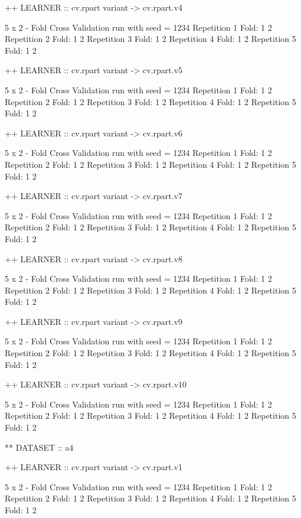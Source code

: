 \documentclass{article}
\begin{document}
\begin{Schunk}
\begin{Soutput}
++ LEARNER :: cv.rpart  variant ->  cv.rpart.v4 

 5 x 2 - Fold Cross Validation run with seed =  1234 
Repetition  1 
Fold:  1  2
Repetition  2 
Fold:  1  2
Repetition  3 
Fold:  1  2
Repetition  4 
Fold:  1  2
Repetition  5 
Fold:  1  2


++ LEARNER :: cv.rpart  variant ->  cv.rpart.v5 

 5 x 2 - Fold Cross Validation run with seed =  1234 
Repetition  1 
Fold:  1  2
Repetition  2 
Fold:  1  2
Repetition  3 
Fold:  1  2
Repetition  4 
Fold:  1  2
Repetition  5 
Fold:  1  2


++ LEARNER :: cv.rpart  variant ->  cv.rpart.v6 

 5 x 2 - Fold Cross Validation run with seed =  1234 
Repetition  1 
Fold:  1  2
Repetition  2 
Fold:  1  2
Repetition  3 
Fold:  1  2
Repetition  4 
Fold:  1  2
Repetition  5 
Fold:  1  2


++ LEARNER :: cv.rpart  variant ->  cv.rpart.v7 

 5 x 2 - Fold Cross Validation run with seed =  1234 
Repetition  1 
Fold:  1  2
Repetition  2 
Fold:  1  2
Repetition  3 
Fold:  1  2
Repetition  4 
Fold:  1  2
Repetition  5 
Fold:  1  2


++ LEARNER :: cv.rpart  variant ->  cv.rpart.v8 

 5 x 2 - Fold Cross Validation run with seed =  1234 
Repetition  1 
Fold:  1  2
Repetition  2 
Fold:  1  2
Repetition  3 
Fold:  1  2
Repetition  4 
Fold:  1  2
Repetition  5 
Fold:  1  2


++ LEARNER :: cv.rpart  variant ->  cv.rpart.v9 

 5 x 2 - Fold Cross Validation run with seed =  1234 
Repetition  1 
Fold:  1  2
Repetition  2 
Fold:  1  2
Repetition  3 
Fold:  1  2
Repetition  4 
Fold:  1  2
Repetition  5 
Fold:  1  2


++ LEARNER :: cv.rpart  variant ->  cv.rpart.v10 

 5 x 2 - Fold Cross Validation run with seed =  1234 
Repetition  1 
Fold:  1  2
Repetition  2 
Fold:  1  2
Repetition  3 
Fold:  1  2
Repetition  4 
Fold:  1  2
Repetition  5 
Fold:  1  2


** DATASET :: a4

++ LEARNER :: cv.rpart  variant ->  cv.rpart.v1 

 5 x 2 - Fold Cross Validation run with seed =  1234 
Repetition  1 
Fold:  1  2
Repetition  2 
Fold:  1  2
Repetition  3 
Fold:  1  2
Repetition  4 
Fold:  1  2
Repetition  5 
Fold:  1  2



\end{Soutput}
\end{Schunk}
\end{document}
